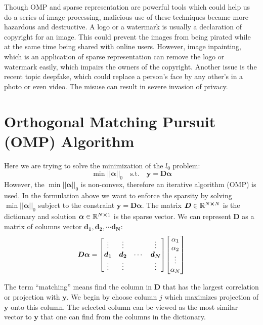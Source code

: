 \documentclass[12pt,letterpaper]{article}
\begin{document}
Though OMP and sparse representation are powerful tools which could help us do a series of image processing, malicious use of these techniques became more hazardous and destructive. A logo or a watermark is usually a declaration of copyright for an image. This could prevent the images from being pirated while at the same time being shared with online users. However, image inpainting, which is an application of sparse representation can remove the logo or watermark easily, which impairs the owners of the copyright. Another issue is the recent topic deepfake, which could replace a person's face by any other's in a photo or even video. The misuse can result in severe invasion of privacy.

\section*{Orthogonal Matching Pursuit (OMP) Algorithm}
Here we are trying to solve the minimization of the $l_0$ problem: 
\[
\min ||\bm{\alpha}||_0 \quad \textrm{s.t.} \quad  \bm{y=D \alpha}
\]
However, the $\min||\bm{\alpha}||_0$ is non-convex, therefore an iterative algorithm (OMP) is used. In the formulation above we want to enforce the sparsity by solving  $\min||\bm{\alpha}||_0$ subject to the constraint $\bm{y=D\alpha}$. The matrix $\bm{D} \in \mathbb{R}^{N \cross N} $ is the dictionary and solution $\bm{\alpha} \in \mathbb{R}^{N \cross 1}$ is the sparse vector. We can represent $\bm{D}$ as a matrix of columns vector $\bm{d_1}, \bm{d_2}, \cdots \bm{d_N}$:
\begin{align*}
  \bm{D\alpha} = 
    \mqty[
      \vdots & \vdots &        & \vdots  \\
         \bm{d_1} & \bm{d_2}    & \cdots & \bm{d_N}   \\
      \vdots & \vdots &        & \vdots 
    ]
    \mqty[
      \alpha_1 \\ 
      \alpha_2 \\
      \vdots \\ 
      \alpha_N\\ 
    ]
\end{align*}

The term ``matching'' means find the column in $\bm{D}$ that has the largest correlation or projection with $\bm{y}$. We begin by choose column $j$ which maximizes projection of $\bm{y}$ onto this column. The selected column can be viewed as the most similar vector to $\bm{y}$ that one can find from the columns in the dictionary.
\end{document}
